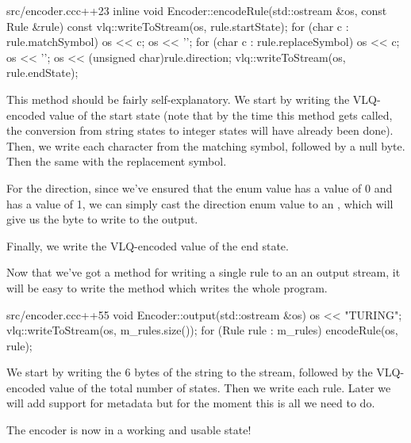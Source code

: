 \begin{file}{src/encoder.cc}{c++}{23}
inline void Encoder::encodeRule(std::ostream &os, const Rule &rule) const
{
    vlq::writeToStream(os, rule.startState);
    for (char c : rule.matchSymbol)
    {
        os << c;
    }
    os << '\0';
    for (char c : rule.replaceSymbol)
    {
        os << c;
    }
    os << '\0';
    os << (unsigned char)rule.direction;
    vlq::writeToStream(os, rule.endState);
}
\end{file}

This method should be fairly self-explanatory. We start by writing the VLQ-encoded value of the start state (note that by the time this method gets called, the conversion from string states to integer states will have already been done). Then, we write each character from the matching symbol, followed by a null byte. Then the same with the replacement symbol.

For the direction, since we've ensured that the enum value  has a value of 0 and  has a value of 1, we can simply cast the direction enum value to an , which will give us the byte to write to the output.

Finally, we write the VLQ-encoded value of the end state.

Now that we've got a method for writing a single rule to an an output stream, it will be easy to write the  method which writes the whole program.

\begin{file}{src/encoder.cc}{c++}{55}
void Encoder::output(std::ostream &os)
{
    os << "TURING";
    vlq::writeToStream(os, m_rules.size());
    for (Rule rule : m_rules)
    {
        encodeRule(os, rule);
    }
}
\end{file}

We start by writing the 6 bytes of the string  to the stream, followed by the VLQ-encoded value of the total number of states. Then we write each rule. Later we will add support for metadata but for the moment this is all we need to do.

The encoder is now in a working and usable state!